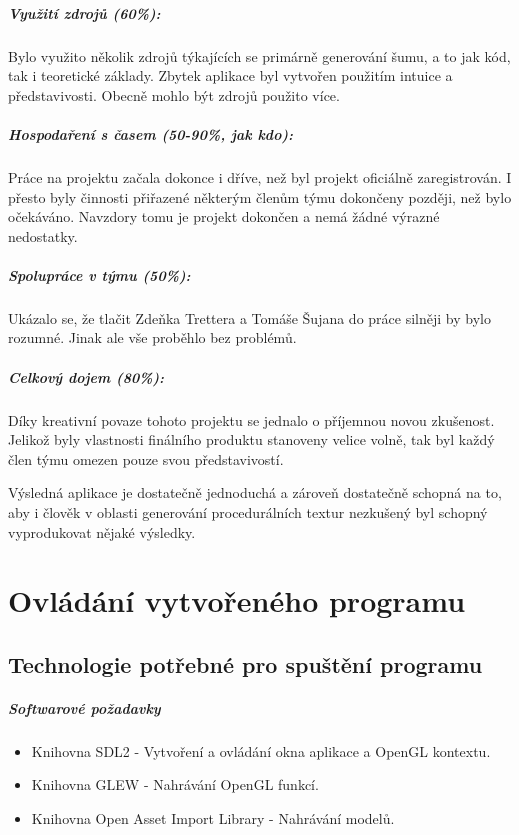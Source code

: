 \documentclass[12pt,a4paper,titlepage,final]{report}
\begin{document}
\paragraph{Využití zdrojů (60\%):} Bylo využito několik zdrojů týkajících se primárně generování šumu, a to jak kód, tak i teoretické základy. Zbytek aplikace byl vytvořen použitím intuice a představivosti. Obecně mohlo být zdrojů použito více.

\paragraph{Hospodaření s časem (50-90\%, jak kdo):} Práce na projektu začala dokonce i dříve, než byl projekt oficiálně zaregistrován. I přesto byly činnosti přiřazené některým členům týmu dokončeny později, než bylo očekáváno. Navzdory tomu je projekt dokončen a nemá žádné výrazné nedostatky.

\paragraph{Spolupráce v týmu (50\%):} Ukázalo se, že tlačit Zdeňka Trettera a Tomáše Šujana do práce silněji by bylo rozumné. Jinak ale vše proběhlo bez problémů.

\paragraph{Celkový dojem (80\%):} Díky kreativní povaze tohoto projektu se jednalo o příjemnou novou zkušenost. Jelikož byly vlastnosti finálního produktu stanoveny velice volně, tak byl každý člen týmu omezen pouze svou představivostí. 

Výsledná aplikace je dostatečně jednoduchá a zároveň dostatečně schopná na to, aby i člověk v oblasti generování procedurálních textur nezkušený byl schopný vyprodukovat nějaké výsledky.

\chapter{Ovládání vytvořeného programu}

\section{Technologie potřebné pro spuštění programu}
\paragraph{Softwarové požadavky}
\begin{itemize}
	\item Knihovna SDL2 - Vytvoření a ovládání okna aplikace a OpenGL kontextu.
	\item Knihovna GLEW - Nahrávání OpenGL funkcí.
	\item Knihovna Open Asset Import Library - Nahrávání modelů.
\end{itemize}
\end{document}
